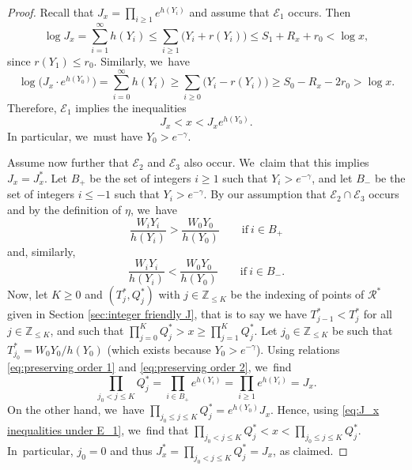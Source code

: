 \documentclass[10pt,a4paper]{article}
\newcommand{\ZZ}{\mathbb{Z}}
\newcommand{\EC}{\mathcal{E}}
\newcommand{\RS}{\mathscr{R}}
\newcommand{\bg}{\big}
\theoremstyle{plain}
\theoremstyle{definition}
\begin{document}
\begin{proof} Recall that $J_x=\prod_{i\ge1}e^{h(Y_i)}$ and assume that $\mathcal E_1$ occurs. Then
\begin{equation}
\label{eq:e1 implies J < x}
\log J_x = \sum_{i=1}^{\infty} h(Y_i) \le \sum_{i \ge 1} \bg(Y_i + r(Y_i)\bg) \le S_1 + R_x +r_0 < \log x,
\end{equation}
since $r(Y_1)\le r_0$. Similarly, we~have
\[
\log\!\bg(J_x\cdot e^{h(Y_0)}\bg) = \sum_{i=0}^{\infty} h(Y_i) \ge \sum_{i \ge 0} \bg(Y_i - r(Y_i)\bg) \ge S_0 - R_x -2r_0 > \log x.
\]
Therefore, $\EC_1$ implies the inequalities
\begin{equation}
\label{eq:J_x inequalities under E_1}
J_x < x < J_x e^{h(Y_0)}.
\end{equation}
In particular, we~must have $Y_0>e^{-\gamma}$.

Assume now further that $\EC_2$ and $\EC_3$ also occur. We~claim that this implies $J_x = J_x^*$. Let $B_+$ be the set of integers $i \ge 1$ such that $Y_i > e^{-\gamma}$, and let $B_-$ be the set of integers $i\le-1$ such that $Y_i>e^{-\gamma}$.
By our assumption that $\EC_2\cap\EC_3$ occurs and by the definition of $\eta$, we~have
\begin{equation}
\label{eq:preserving order 1}
\frac{W_iY_i}{h(Y_i)} > \frac{W_0Y_0}{h(Y_0)} \qquad\text{if}\ i\in B_+
\end{equation}
and, similarly,
\begin{equation}
\label{eq:preserving order 2}
\frac{W_iY_i}{h(Y_i)} < \frac{W_0Y_0}{h(Y_0)} \qquad\text{if}\ i\in B_-.
\end{equation}
Now, let $K \ge 0$ and $(T_j^*,Q_j^*)$ with $j\in\ZZ_{\le K}$ be the indexing of points of $\RS^*$ given in Section \ref{sec:integer friendly J}, that is to say we have $T_{j-1}^*<T_{j}^*$ for all $j \in \ZZ_{\le K}$, and such that $\prod_{j=0}^K Q_j^*>x \ge \prod_{j=1}^K Q_j^*$. Let $j_0\in\ZZ_{\le K}$ be such that $T_{j_0}^* = W_0Y_0/h(Y_0)$ (which exists because $Y_0>e^{-\gamma}$). Using relations \eqref{eq:preserving order 1} and \eqref{eq:preserving order 2}, we~find
\[
\prod_{j_0 < j \le K} Q_j^*=\prod_{i\in B_+} e^{h(Y_i)} = \prod_{i\ge1} e^{h(Y_i)} = J_x.
\]
On the other hand, we~have $\prod_{j_0 \le j \le K} Q_j^*=e^{h(Y_0)} J_x$. Hence, using \eqref{eq:J_x inequalities under E_1}, we~find that $\prod_{j_0 \!<\! j \!\le\! K}Q_j^*\!<\!x\!<\!\prod_{j_0 \le j \le K}Q_j^*$. In~particular, $j_0\!=\!0$ and thus $J_x^*=\prod_{j_0 < j \le K} Q_j^*\!=\!J_x$, as claimed.
\end{proof}
\end{document}
